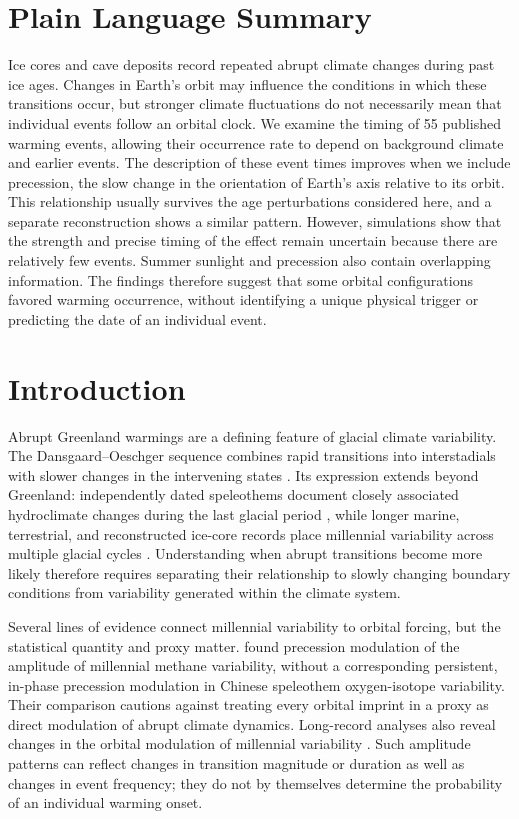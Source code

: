\documentclass[11pt]{article}
\begin{document}
\section*{Plain Language Summary}
Ice cores and cave deposits record repeated abrupt climate changes during past ice ages. Changes in Earth's orbit may influence the conditions in which these transitions occur, but stronger climate fluctuations do not necessarily mean that individual events follow an orbital clock. We examine the timing of 55 published warming events, allowing their occurrence rate to depend on background climate and earlier events. The description of these event times improves when we include precession, the slow change in the orientation of Earth's axis relative to its orbit. This relationship usually survives the age perturbations considered here, and a separate reconstruction shows a similar pattern. However, simulations show that the strength and precise timing of the effect remain uncertain because there are relatively few events. Summer sunlight and precession also contain overlapping information. The findings therefore suggest that some orbital configurations favored warming occurrence, without identifying a unique physical trigger or predicting the date of an individual event.

\section{Introduction}
Abrupt Greenland warmings are a defining feature of glacial climate variability. The Dansgaard--Oeschger sequence combines rapid transitions into interstadials with slower changes in the intervening states \citep{dansgaard1993evidence,rasmussen2014stratigraphic}. Its expression extends beyond Greenland: independently dated speleothems document closely associated hydroclimate changes during the last glacial period \citep{corrick2020synchronous}, while longer marine, terrestrial, and reconstructed ice-core records place millennial variability across multiple glacial cycles \citep{barker2011800,sun2021persistent,hodell20231}. Understanding when abrupt transitions become more likely therefore requires separating their relationship to slowly changing boundary conditions from variability generated within the climate system.

Several lines of evidence connect millennial variability to orbital forcing, but the statistical quantity and proxy matter. \citet{thirumalai2020methane} found precession modulation of the amplitude of millennial methane variability, without a corresponding persistent, in-phase precession modulation in Chinese speleothem oxygen-isotope variability. Their comparison cautions against treating every orbital imprint in a proxy as direct modulation of abrupt climate dynamics. Long-record analyses also reveal changes in the orbital modulation of millennial variability \citep{sun2021persistent,hodell20231}. Such amplitude patterns can reflect changes in transition magnitude or duration as well as changes in event frequency; they do not by themselves determine the probability of an individual warming onset.
\end{document}
